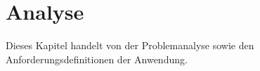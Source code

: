 \chapter{Analyse} \label{sec:Analyse}
Dieses Kapitel handelt von der Problemanalyse sowie den Anforderungsdefinitionen der Anwendung.
